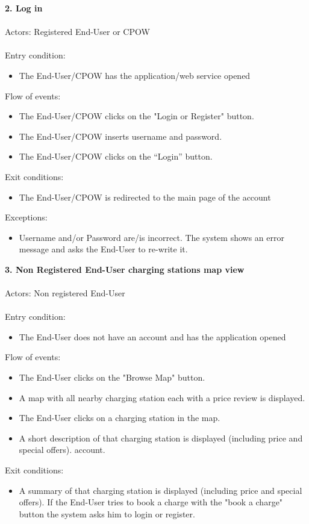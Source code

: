 \documentclass[a4paper]{report}
\begin{document}
\textbf{2. Log in}\label{uc:1}
\\
\\
Actors: Registered End-User or CPOW\\ \\
Entry condition:
\begin{itemize}
\item The End-User/CPOW has the application/web service opened
\end{itemize}
Flow of events:
\begin{itemize}
\item The End-User/CPOW clicks on the "Login or Register" button.
\item The End-User/CPOW inserts username and password.
\item The End-User/CPOW clicks on the “Login” button.
\end{itemize}
Exit conditions:
\begin{itemize}
\item The End-User/CPOW is redirected to the main page of the account
\end{itemize}
Exceptions:
\begin{itemize}
\item Username and/or Password are/is incorrect. The system shows an error message and asks the End-User to re-write it.
\end{itemize}
\textbf{3. Non Registered End-User charging stations map view}\label{uc:1}
\\
\\
Actors: Non registered End-User\\ \\
Entry condition:
\begin{itemize}
\item The End-User does not have an account and has the application opened
\end{itemize}
Flow of events:
\begin{itemize}
\item The End-User clicks on the "Browse Map" button.
\item A map with all nearby charging station each with a price review is displayed.
\item The End-User clicks on a charging station in the map.
\item A short description of that charging station is displayed (including price and special offers).
 account.
\end{itemize}
Exit conditions:
\begin{itemize}
\item A summary of that charging station is displayed (including price and special offers). If the End-User tries to book a charge with the "book a charge" button the system asks him to login or register.
\end{itemize}
\end{document}
